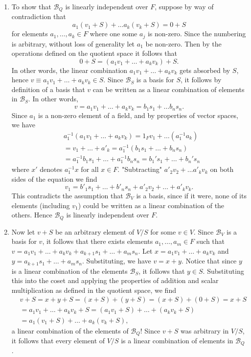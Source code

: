 \documentclass{article}
\newcommand{\inv}[1]{#1^{-1}}
\begin{document}
\begin{enumerate}
    \item To show that $\mathcal{B}_Q$ is linearly independent over $F$, suppose by way of contradiction that 
    $$a_1(v_1 + S) + \dots a_k(v_k + S) = 0 + S$$ for elements $a_1,\dots, a_k\in F$ where one some $a_j$ is non-zero. Since the numbering is arbitrary, without loss of generality let $a_1 $ be non-zero. Then by the operations defined on the quotient space it follows that 
    $$0 + S = (a_1v_1 + \dots + a_k v_k) + S.$$
    In other words, the linear combination $a_1v_1 + \dots + a_kv_k$ gets absorbed by $S$, hence $v\equiv a_1v_1 + \dots +a_k v_k\in S$. Since $\mathcal{B}_S$ is a basis for $S$, it follows by definition of a basis that $v$ can be written as a linear combination of elements in $\mathcal{B}_S$. In other words, 
    $$v = a_1 v_1 + \dots + a_k v_k = b_1 s_1 + \dots b_n s_n.$$ Since $a_1$ is a non-zero element of a field, and by properties of vector spaces, we have 
    $$
    \begin{array}{cc}
         & \inv{a_1}(a_1v_1 + \dots + a_k v_k) = 1_Fv_1 + \dots (\inv{a_1}a_k) \\
         & = v_1 + \dots + a'_k = \inv{a_1}(b_1s_1 + \dots + b_n s_n)\\
         & = \inv{a_1}b_1 s_1 + \dots + \inv{a_1}b_n s_n = b_1' s_1 + \dots + b_n' s_n
    \end{array} 
    $$
    where $x'$ denotes $\inv{a_1}x$ for all $x\in F$. "Subtracting" $a'_2 v_2 + \dots a'_k v_k$ on both sides of the equation we find
    $$ v_1 = b'_1s_1 + \dots  + b'_n s_n + a'_2v_2 + \dots + a'_k v_k.$$
    This contradicts the assumption that $\mathcal{B}_V$ is a basis, since if it were, none of its elements (including $v_1$) could be written as a linear combination of the others. Hence $\mathcal{B}_Q$ is linearly independent over $F$.
    \item Now let $v + S$ be an arbitrary element of $V/S$ for some $v\in V$. Since $\mathcal{B}_V$ is a basis for $v$, it follows that there exists elements $a_1, \dots , a_m\in F$ such that $v = a_1v_1 + \dots + a_k v_k + a_{k+ 1}s_1 + \dots + a_m s_n$. Let $x = a_1v_1 + \dots + a_k v_k$ and $y = a_{k+ 1}s_1 + \dots + a_m s_n$. Substituting, we have $v = x + y$. Notice that since $y$ is a linear combination of the elements $\mathcal{B}_S$, it follows that $y\in S$. Substituting this into the coset and applying the properties of addition and scalar multiplication as defined in the quotient space, we find $$
    \begin{array}{cc}
         & v + S = x + y + S = (x + S) + (y + S) = (x + S) + (0 + S) = x + S \\
         & = a_1v_1 + \dots + a_k v_k + S = (a_1 v_1 + S) + \dots + (a_k v_k + S) \\
         & = a_1(v_1 + S) + \dots + a_k(v_k + S),
    \end{array}$$ a linear combination of the elements of $\mathcal{B}_Q$! Since $v + S$ was arbitrary in $V/S$, it follows that every element of $V/S$ is a linear combination of elements in $\mathcal{B}_Q$. 
\end{enumerate}
\end{document}
